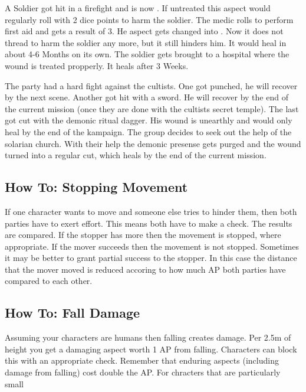 \documentclass[11pt]{article}
\begin{document}
{\begin{pwexample}
A Soldier got hit in a firefight and is now . If untreated this aspect would regularly roll with 2 dice points to harm the soldier. The medic rolls to perform first aid and gets a result of 3. He aspect gets changed into . Now it does not thread to harm the soldier any more, but it still hinders him. It would heal in about 4-6 Months on its own. The soldier gets brought to a hospital where the wound is treated propperly. It heals after 3 Weeks. 
\end{pwexample}

\begin{pwexample}
The party had a hard fight against the cultists. One got punched, he will recover by the next scene. Another got hit with a sword. He will recover by the end of the current mission (once they are done with the cultists secret temple). The last got cut with the demonic ritual dagger. His wound is unearthly and would only heal by the end of the kampaign. The group decides to seek out the help of the solarian church. With their help the demonic presense gets purged  and the wound turned into a regular cut, which heals by the end of the current mission.
\end{pwexample}
\subsection{How To: Stopping Movement}
\label{sec:org5b29a39}
If one character wants to move and someone else tries to hinder them, then both parties have to exert effort. This means both have to make a check. The results are compared. If the stopper has more then the movement is stopped, where appropriate. If the mover succeeds then the movement is not stopped. Sometimes it may be better to grant partial success to the stopper. In this case the distance that the mover moved is reduced accoring to how much AP both parties have compared to each other.
\subsection{How To: Fall Damage}
\label{sec:org35c17af}
Assuming your characters are humans then falling creates damage. Per 2.5m of height you get a damaging aspect worth 1 AP from falling. Characters can block this with an appropriate check. Remember that enduring aspects (including damage from falling) cost double the AP.
For chracters that are particularly small

}
\end{document}
